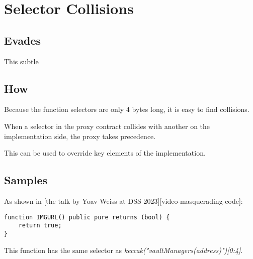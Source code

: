 \section{Selector Collisions}

\subsection{Evades}

This subtle 

\subsection{How}

Because the function selectors are only 4 bytes long, it is easy to find collisions.

When a selector in the proxy contract collides with another on the implementation side, the proxy takes precedence.

This can be used to override key elements of the implementation.

\subsection{Samples}

As shown in [the talk by Yoav Weiss at DSS 2023][video-masquerading-code]:

\begin{lstlisting}
function IMGURL() public pure returns (bool) {
	return true;
}
\end{lstlisting}

This function has the same selector as \emph{keccak("vaultManagers(address)")[0:4]}.
